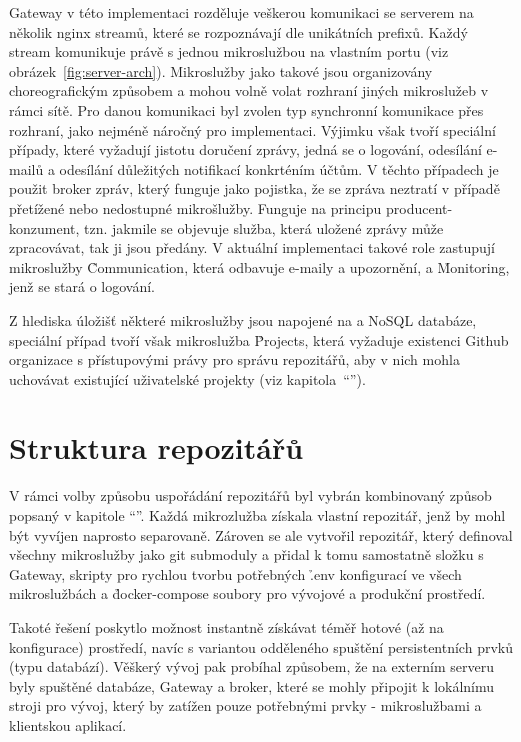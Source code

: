 Gateway v této implementaci rozděluje veškerou komunikaci se serverem na několik nginx streamů, které se rozpoznávají dle unikátních  prefixů.
Každý stream komunikuje právě s jednou mikroslužbou na vlastním portu (viz obrázek~\ref{fig:server-arch}).
Mikroslužby jako takové jsou organizovány choreografickým způsobem a mohou volně volat rozhraní jiných mikroslužeb v rámci sítě.
Pro danou komunikaci byl zvolen typ synchronní komunikace přes  rozhraní, jako nejméně náročný pro implementaci.
Výjimku však tvoří speciální případy, které vyžadují jistotu doručení zprávy, jedná se o logování, odesílání e-mailů a odesílání důležitých notifikací konkrténím účtům.
V těchto případech je použit broker zpráv, který funguje jako pojistka, že se zpráva neztratí v případě přetížené nebo nedostupné mikrošlužby.
Funguje na principu producent-konzument, tzn.
jakmile se objevuje služba, která uložené zprávy může zpracovávat, tak ji jsou předány.
V aktuální implementaci takové role zastupují mikroslužby \h{Communication}, která odbavuje e-maily a upozornění, a \h{Monitoring}, jenž se stará o logování.

Z hlediska úložišť některé mikroslužby jsou napojené na  a NoSQL databáze, speciální případ tvoří však mikroslužba \h{Projects}, která vyžaduje existenci Github organizace s přístupovými právy pro správu repozitářů, aby v nich mohla uchovávat existující uživatelské projekty (viz kapitola~\enquote{}).



\section{Struktura repozitářů}\label{sec:repository-structure}

V rámci volby způsobu uspořádání repozitářů byl vybrán kombinovaný způsob popsaný v kapitole \enquote{}.
Každá mikrozlužba získala vlastní repozitář, jenž by mohl být vyvíjen naprosto separovaně.
Zároven se ale vytvořil repozitář, který definoval všechny mikroslužby jako git submoduly a přidal k tomu samostatně složku s Gateway, skripty pro rychlou tvorbu potřebných \h{.env} konfigurací ve všech mikroslužbách a \h{docker-compose} soubory pro vývojové a produkční prostředí.

Takoté řešení poskytlo možnost instantně získávat téměř hotové (až na konfigurace) prostředí, navíc s variantou odděleného spuštění persistentních prvků (typu databází).
Věškerý vývoj  pak probíhal způsobem, že na externím serveru byly spuštěné databáze, Gateway a broker, které se mohly připojit k lokálnímu stroji pro vývoj, který by zatížen pouze potřebnými prvky - mikroslužbami a klientskou aplikací.



